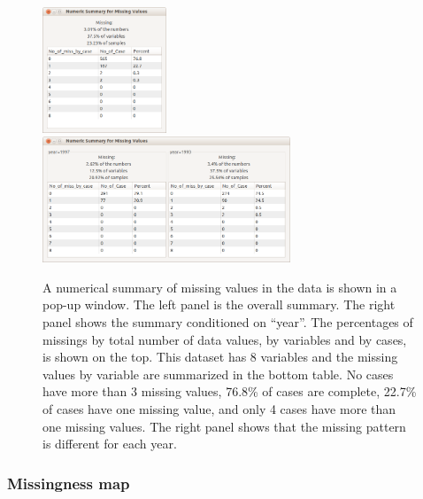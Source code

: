 \documentclass[article]{jss}
\begin{document}
\begin{center}
\begin{figure}[h]
\begin{centering}
\includegraphics[width=0.33\textwidth]{graph/fig2-summary-1}
\includegraphics[width=0.66\textwidth]{graph/fig2-summary-2-condition}
\par\end{centering}
\caption{A numerical summary of missing values in the data is shown in a pop-up window. The left panel is the overall summary. The right panel shows the summary conditioned on ``year''. The percentages of missings by total number of data values, by variables and by cases, is shown on the top. This dataset has 8 variables and the missing values by variable are summarized in the bottom table. No cases have more than 3 missing values,  76.8\% of cases are complete, 22.7\% of cases have one missing value, and only 4 cases have more than one missing values. The right panel shows that the missing pattern is different for each year.}
\label{fig: num-summry}
\end{figure}
\par\end{center}

\subsubsection{Missingness map}
\end{document}
